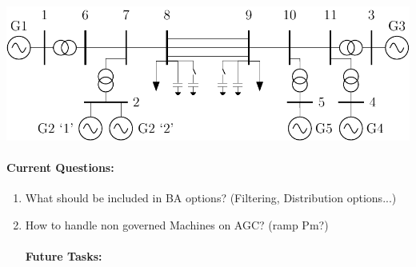 \documentclass[12pt]{article}
\begin{document}
\begin{multicols}{2}
\begin{enumerate}

	\end{enumerate}
\includegraphics[width=\linewidth]{../../models/sixMachine/sixMachine}
\vfill\null
\columnbreak
	\paragraph{Current Questions:}
	\begin{enumerate}

	\item What should be included in BA options? (Filtering, Distribution options...)
	\item How to handle non governed Machines on AGC? (ramp Pm?)
	
		






\paragraph{Future Tasks:} %
	\begin{enumerate}


\end{enumerate}
\end{enumerate}
\end{multicols}
\end{document}

